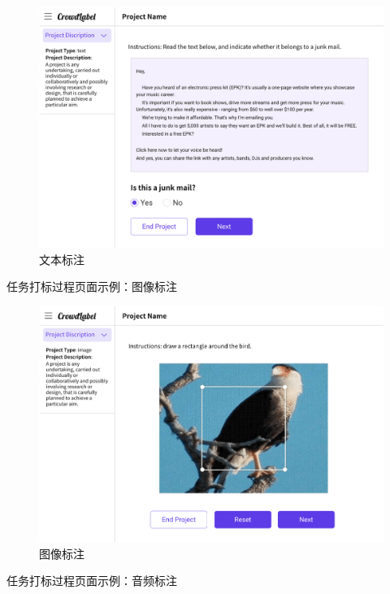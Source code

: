 \begin{figure}[h!]
    \centering
    \includegraphics[width=\linewidth]{imgs/prototype/text.png}
    \caption{文本标注}
\end{figure}

\newpage

任务打标过程页面示例：图像标注

\begin{figure}[h!]
    \centering
    \includegraphics[width=\linewidth]{imgs/prototype/img.png}
    \caption{图像标注}
\end{figure}

\newpage

任务打标过程页面示例：音频标注


